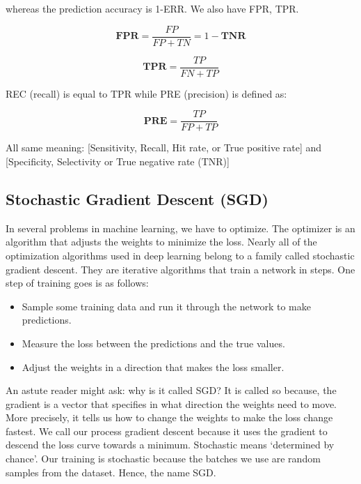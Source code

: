 \documentclass[11pt]{article}
\begin{document}
whereas the prediction accuracy is 1-ERR. We also have FPR, TPR. 

\begin{equation}
\textbf{FPR} = \frac{FP}{FP+TN}  = 1 - \textbf{TNR} 
\end{equation}

\begin{equation}
\textbf{TPR} = \frac{TP}{FN+TP} 
\end{equation}

REC (recall) is equal to TPR while PRE (precision) is defined as:


\begin{equation}
\textbf{PRE} = \frac{TP}{FP+TP} 
\end{equation}



All same meaning: [Sensitivity, Recall, Hit rate, or True positive rate] and [Specificity, Selectivity or True negative rate (TNR)]





\subsection{Stochastic Gradient Descent (SGD)} 


In several problems in machine learning, we have to optimize. The optimizer is an algorithm that adjusts the weights to minimize the loss. Nearly 
all of the optimization algorithms used in deep learning belong to a family called stochastic gradient descent. 
They are iterative algorithms that train a network in steps. One step of training goes is as follows:

\begin{itemize}
\item Sample some training data and run it through the network to make predictions.
\item Measure the loss between the predictions and the true values.
\item Adjust the weights in a direction that makes the loss smaller.
\end{itemize} 


An astute reader might ask: why is it called SGD? 
It is called so because, the gradient is a vector that specifies in what direction the weights need to move. 
More precisely, it tells us how to change the weights to make the loss change fastest. We call our process 
gradient descent because it uses the gradient to descend the loss curve towards a minimum. Stochastic means 
`determined by chance'. Our training is stochastic because the batches we use 
are random samples from the dataset. Hence, the name SGD. 
\end{document}
